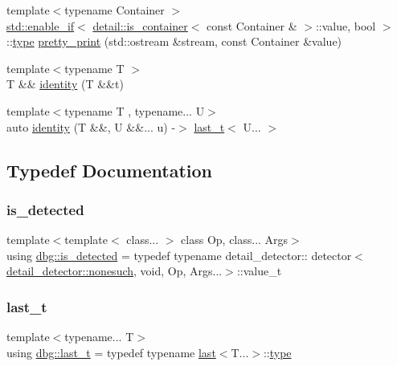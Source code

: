 \begin{DoxyCompactItemize}
\item 
{\footnotesize template$<$typename Container $>$ }\\\hyperlink{structstd_1_1enable__if}{std\+::enable\+\_\+if}$<$ \hyperlink{structdbg_1_1detail_1_1is__container}{detail\+::is\+\_\+container}$<$ const Container \& $>$\+::value, bool $>$\+::\hyperlink{namespacedbg_a2365d80e3a3525e6025040383ff8661b}{type} \hyperlink{namespacedbg_a1212dc990d58f20efcf5d66eb4a5781c}{pretty\+\_\+print} (std\+::ostream \&stream, const Container \&value)
\item 
{\footnotesize template$<$typename T $>$ }\\T \&\& \hyperlink{namespacedbg_a23f10decf1edf2d34e226437e5562452}{identity} (T \&\&t)
\item 
{\footnotesize template$<$typename T , typename... U$>$ }\\auto \hyperlink{namespacedbg_a2f87ce2acfce330c46dba7f4c62c2fb8}{identity} (T \&\&, U \&\&... u) -\/$>$ \hyperlink{namespacedbg_a4754c7365d6eb31696a4613230e21ac4}{last\+\_\+t}$<$ U... $>$
\end{DoxyCompactItemize}


\subsection{Typedef Documentation}
\mbox{\label{namespacedbg_a4fff29dc9282f3e887a7c1290477708c}} 
\subsubsection{\texorpdfstring{is\+\_\+detected}{is\_detected}}
{\footnotesize\ttfamily template$<$template$<$ class... $>$ class Op, class... Args$>$ \\
using \hyperlink{namespacedbg_a4fff29dc9282f3e887a7c1290477708c}{dbg\+::is\+\_\+detected} = typedef typename detail\+\_\+detector\+:: detector$<$\hyperlink{structdbg_1_1detail__detector_1_1nonesuch}{detail\+\_\+detector\+::nonesuch}, void, Op, Args...$>$\+::value\+\_\+t}

\mbox{\label{namespacedbg_a4754c7365d6eb31696a4613230e21ac4}} 
\subsubsection{\texorpdfstring{last\+\_\+t}{last\_t}}
{\footnotesize\ttfamily template$<$typename... T$>$ \\
using \hyperlink{namespacedbg_a4754c7365d6eb31696a4613230e21ac4}{dbg\+::last\+\_\+t} = typedef typename \hyperlink{structdbg_1_1last}{last}$<$T...$>$\+::\hyperlink{namespacedbg_a2365d80e3a3525e6025040383ff8661b}{type}}



